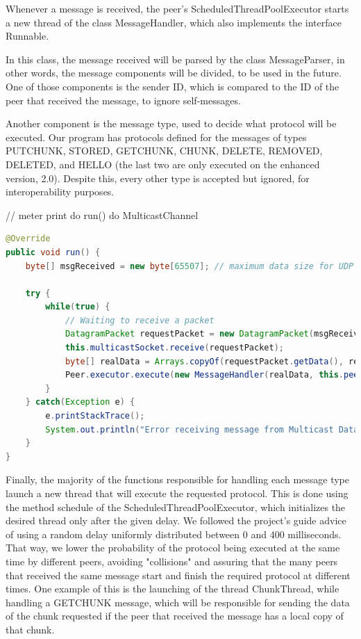 \documentclass[11pt]{article}
\begin{document}
Whenever a message is received, the peer's ScheduledThreadPoolExecutor starts a new thread of the class MessageHandler, which also implements the interface Runnable.

In this class, the message received will be parsed by the class MessageParser, in other words, the message components will be divided, to be used in the future.
One of those components is the sender ID, which is compared to the ID of the peer that received the message, to ignore self-messages.

Another component is the message type, used to decide what protocol will be executed. Our program has protocols defined for the messages of types PUTCHUNK, STORED, GETCHUNK, CHUNK, DELETE, REMOVED, DELETED, and HELLO (the last two are only executed on the enhanced version, 2.0).
Despite this, every other type is accepted but ignored, for interoperability purposes.

// meter print do run() do MulticastChannel

\begin{lstlisting}[language=java]
@Override
public void run() {
	byte[] msgReceived = new byte[65507]; // maximum data size for UDP packet -> https://en.wikipedia.org/wiki/User_Datagram_Protocol

    try {
        while(true) {
            // Waiting to receive a packet
            DatagramPacket requestPacket = new DatagramPacket(msgReceived, msgReceived.length);
            this.multicastSocket.receive(requestPacket);
            byte[] realData = Arrays.copyOf(requestPacket.getData(), requestPacket.getLength());
            Peer.executor.execute(new MessageHandler(realData, this.peerID, requestPacket.getAddress()));
        }
    } catch(Exception e) {
        e.printStackTrace();
        System.out.println("Error receiving message from Multicast Data Channel (MDB)");
    }
}
\end{lstlisting}

Finally, the majority of the functions responsible for handling each message type launch a new thread that will execute the requested protocol.
This is done using the method schedule of the ScheduledThreadPoolExecutor, which initializes the desired thread only after the given delay.
We followed the project's guide advice of using a random delay uniformly distributed between 0 and 400 milliseconds.
That way, we lower the probability of the protocol being executed at the same time by different peers, avoiding "collisions" and assuring that the many peers that received the same message start and finish the required protocol at different times.
One example of this is the launching of the thread ChunkThread, while handling a GETCHUNK message, which will be responsible for sending the data of the chunk requested if the peer that received the message has a local copy of that chunk.
\end{document}
